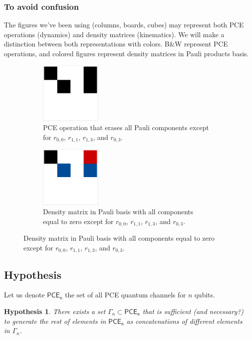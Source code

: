 \documentclass[11pt,dvipsnames]{article} %
\newtheorem{conj}{Hypothesis}
\newcommand{\1}{\mathds{1}}
\newcommand{\PCE}[1]{\mathsf{PCE}_\mathsf{#1}}
\begin{document}
\subsubsection*{To avoid confusion} %
The figures we've been using (columns, boards, cubes) may represent
both PCE operations (dynamics) and density matrices (kinematics). We
will make a distinction between both representations with colors.
B$\&$W represent PCE operations, and colored figures represent 
density matrices in Pauli products basis.
\begin{figure}[H]
\begin{subfigure}{.5\textwidth}
\centering
\includegraphics[width=3cm]{PCEoperation}
\caption{PCE operation that erases all Pauli components except 
for $r_{0,0}$, $r_{1,1}$, $r_{1,3}$, and $r_{0,3}$.}
\end{subfigure}
\begin{subfigure}{.5\textwidth}
\centering
\includegraphics[width=3cm]{state}
\caption{Density matrix in Pauli basis with all components equal
to zero except for $r_{0,0}$, $r_{1,1}$, $r_{1,3}$, and $r_{0,3}$.}
\end{subfigure}
\end{figure}

\subsection*{Hypothesis} %
Let us denote $\PCE{n}$ the set of all PCE quantum channels for 
$n$ qubits.
\begin{conj}{}
There exists a set $\Gamma_n\subset\PCE{n}$ that is sufficient (and 
necessary?) to generate the rest of elements in $\PCE{n}$ as 
concatenations of different elements in $\Gamma_n$.
\end{conj}
\end{document}
